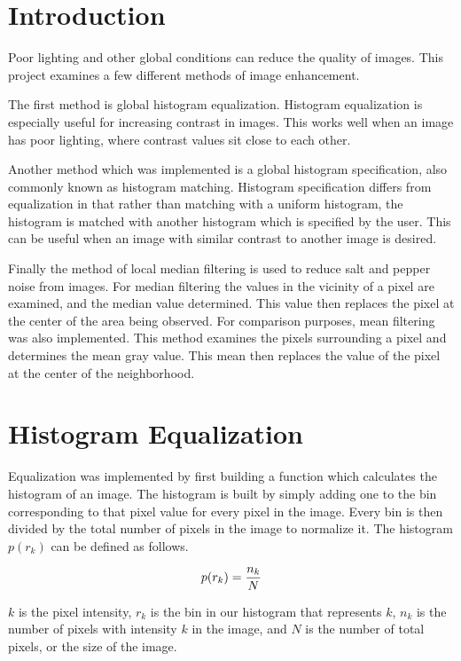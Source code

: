 \section{Introduction}
  Poor lighting and other global conditions can reduce the quality of images. This project
  examines a few different methods of image enhancement.
  
  The first method is global histogram equalization.  Histogram equalization is especially
  useful for increasing contrast in images.  This works well when an image
  has poor lighting, where contrast values sit close to each other.

  Another method which was implemented is a global histogram specification, also commonly
  known as histogram matching.  Histogram specification differs from equalization in that
  rather than matching with a uniform histogram, the histogram is matched with another
  histogram which is specified by the user.  This can be useful when an image with similar contrast
  to another image is desired.
  
  Finally the method of local median filtering is used to reduce salt and pepper noise from
  images. For median filtering the values in the vicinity of a pixel are examined, and the
  median value determined.  This value then replaces the pixel at the center of the area
  being observed. For comparison purposes, mean filtering was also implemented.  This method
  examines the pixels surrounding a pixel and determines the mean gray value.
  This mean then replaces the value of the pixel at the center of the neighborhood.
  
  \section{Histogram Equalization}
  \label{subsec:equalization}

  Equalization was implemented by first building a function which calculates the histogram of
  an image. The histogram is built by simply adding one to the bin corresponding to that
  pixel value for every pixel in the image.  Every bin is then divided by the total number
  of pixels in the image to normalize it.  The histogram $p(r_k)$ can be defined as follows.
  
  \[
    p(r_k)={n_k \over N}
  \]

  $k$ is the pixel intensity, $r_k$ is the bin in our histogram that represents $k$, $n_k$ is the
  number of pixels with intensity $k$ in the image, and $N$ is the number of total pixels, or the
  size of the image.

